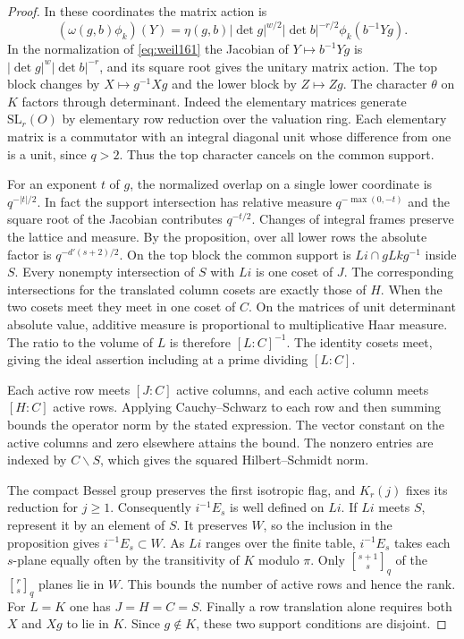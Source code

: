 \documentclass[a4paper,11pt]{article}
\theoremstyle{definition}
\theoremstyle{remark}
\numberwithin{equation}{section}
\begin{document}
\begin{proof}
In these coordinates the matrix action is
\[
 (\omega(g,b)\phi_k)(Y)=\eta(g,b)|\det g|^{w/2}|\det b|^{-r/2}
                                              \phi_k(b^{-1}Yg).
\]
In the normalization of \eqref{eq:weil161} the Jacobian of $Y\mapsto b^{-1}Yg$
is $|\det g|^w|\det b|^{-r}$, and its square root gives the unitary
matrix action. The top block changes by $X\mapsto g^{-1}Xg$ and
the lower block by $Z\mapsto Zg$. The character $\theta$ on $K$
factors through determinant. Indeed the elementary matrices generate
$\mathrm{SL}_r(O)$ by elementary row reduction over the valuation
ring. Each elementary matrix is a commutator with an integral diagonal
unit whose difference from one is a unit, since $q>2$. Thus the top
character cancels on the common support.

For an exponent $t$ of $g$, the normalized overlap on a single lower
coordinate is $q^{-|t|/2}$. In fact the support intersection has
relative measure $q^{-\max(0,-t)}$ and the square root of the Jacobian
contributes $q^{-t/2}$. Changes of integral frames preserve the
lattice and measure. By the proposition, over all lower rows the
absolute factor is $q^{-d'(s+2)/2}$. On the top block the common
support is $Li\cap gLkg^{-1}$ inside $S$. Every nonempty intersection
of $S$ with $Li$ is one coset of $J$. The corresponding intersections
for the translated column cosets are exactly those of $H$. When the
two cosets meet they meet in one coset of $C$. On the matrices of
unit determinant absolute value, additive measure is proportional
to multiplicative Haar measure. The ratio to the volume of $L$ is
therefore $[L:C]^{-1}$. The identity cosets meet, giving the ideal
assertion including at a prime dividing $[L:C]$.

Each active row meets $[J:C]$ active columns, and each active column
meets $[H:C]$ active rows. Applying Cauchy--Schwarz to each row and
then summing bounds the operator norm by the stated expression.
The vector constant on the active columns and zero elsewhere attains
the bound. The nonzero entries are indexed by $C\backslash S$,
which gives the squared Hilbert--Schmidt norm.

The compact Bessel group preserves the first isotropic flag, and
$K_r(j)$ fixes its reduction for $j\ge1$. Consequently $i^{-1}E_s$
is well defined on $Li$. If $Li$ meets $S$, represent it by an element of $S$. It preserves
$W$, so the inclusion in the proposition gives $i^{-1}E_s\subset W$. As $Li$ ranges over the finite table, $i^{-1}E_s$
takes each $s$-plane equally often by the transitivity of $K$ modulo
$\pi$. Only ${s+1\brack s}_q$ of the ${r\brack s}_q$ planes lie in
$W$. This bounds the number of active rows and hence the rank. For
$L=K$ one has $J=H=C=S$. Finally a row translation alone requires
both $X$ and $Xg$ to lie in $K$. Since $g\notin K$, these two support
conditions are disjoint.
\end{proof}
\end{document}
